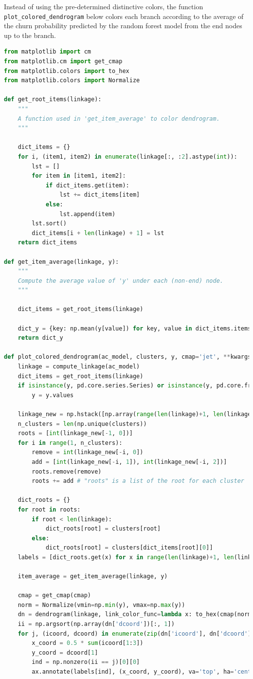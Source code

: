 \documentclass{article}
\begin{document}
Instead of using the pre-determined distinctive colors, the function \verb|plot_colored_dendrogram| below colors each branch according to the average of the churn probability predicted by the random forest model from the end nodes up to the branch.

\begin{lstlisting}[language=Python]
from matplotlib import cm
from matplotlib.cm import get_cmap
from matplotlib.colors import to_hex
from matplotlib.colors import Normalize

def get_root_items(linkage):
    """
    A function used in 'get_item_average' to color dendrogram.
    """
    
    dict_items = {}
    for i, (item1, item2) in enumerate(linkage[:, :2].astype(int)):
        lst = []
        for item in [item1, item2]:
            if dict_items.get(item):
                lst += dict_items[item]
            else:
                lst.append(item)
        lst.sort()
        dict_items[i + len(linkage) + 1] = lst
    return dict_items

def get_item_average(linkage, y):
    """
    Compute the average value of 'y' under each (non-end) node.
    """
    
    dict_items = get_root_items(linkage)
        
    dict_y = {key: np.mean(y[value]) for key, value in dict_items.items()}
    return dict_y

def plot_colored_dendrogram(ac_model, clusters, y, cmap='jet', **kwargs):
    linkage = compute_linkage(ac_model)
    dict_items = get_root_items(linkage)
    if isinstance(y, pd.core.series.Series) or isinstance(y, pd.core.frame.DataFrame):
        y = y.values
    
    linkage_new = np.hstack([np.array(range(len(linkage)+1, len(linkage)*2+1)).reshape(-1, 1), linkage])
    n_clusters = len(np.unique(clusters))
    roots = [int(linkage_new[-1, 0])]
    for i in range(1, n_clusters):
        remove = int(linkage_new[-i, 0])
        add = [int(linkage_new[-i, 1]), int(linkage_new[-i, 2])]
        roots.remove(remove)
        roots += add # "roots" is a list of the root for each cluster
        
    dict_roots = {}
    for root in roots:
        if root < len(linkage):
            dict_roots[root] = clusters[root]
        else:
            dict_roots[root] = clusters[dict_items[root][0]]
    labels = [dict_roots.get(x) for x in range(len(linkage)+1, len(linkage)*2+1)]
    
    item_average = get_item_average(linkage, y)
    
    cmap = get_cmap(cmap)
    norm = Normalize(vmin=np.min(y), vmax=np.max(y))
    dn = dendrogram(linkage, link_color_func=lambda x: to_hex(cmap(norm(item_average[x]))), **kwargs)
    ii = np.argsort(np.array(dn['dcoord'])[:, 1])
    for j, (icoord, dcoord) in enumerate(zip(dn['icoord'], dn['dcoord'])):
        x_coord = 0.5 * sum(icoord[1:3])
        y_coord = dcoord[1]
        ind = np.nonzero(ii == j)[0][0]
        ax.annotate(labels[ind], (x_coord, y_coord), va='top', ha='center', fontsize=18, color='red')
\end{lstlisting}
\end{document}
